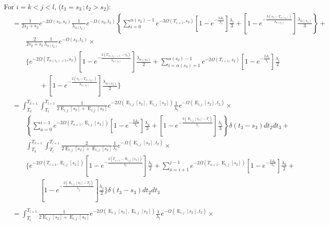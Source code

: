 \documentclass{article}
\DeclareMathOperator{\E}{E}
\begin{document}
For $i=k< j<l$, ($t_3=s_3\,;t_2>s_2$):
\begin{align*}
    &=\frac{1}{2s_2+s_3}e^{-2\Omega(s_3,s_2)}\frac{1}{\lambda_{\alpha(t_2)}}e^{-\Omega(s_2,t_2)}
    \left\{\sum_{i=0}^{\alpha(s_3)-1}e^{-3\Omega(T_{i+1},s_3)}
        \left[1-e^{-\frac{3\Delta_i}{\lambda_i}}\right]\frac{\lambda_i}{3}+
    \left[1-e^{-\frac{3\left(s_3-T_{\alpha(s_3)}\right)}{\lambda_{\alpha(s_3)}}}\right]
        \frac{\lambda_{\alpha(s_3)}}{3}\right\}+\\
    &\qquad\frac{2}{2s_2+s_3}\frac{1}{\lambda_{\alpha(t_2)}}e^{-\Omega(s_2,t_2)}\times\\
    &\qquad\Bigg\{e^{-2\Omega(T_{\alpha(s_3)+1},s_2)}\left[1-e^{-\frac{2\left(T_{\alpha(s_3)+1}-s_3\right)}{\lambda_{\alpha(s_3)}}}\right]\frac{\lambda_{\alpha(s_3)}}{2}+\sum_{i=\alpha(s_3)+1}^{\alpha(s_2)-1}e^{-2\Omega\left(T_{i+1},s_2\right)}\left[1-e^{-\frac{2\Delta_i}{\lambda_i}}\right]\frac{\lambda_i}{2}\\
    &\qquad\qquad+\left[1-e^{-\frac{2\left(s_2-T_{\alpha(s_2)}\right)}{\lambda_{\alpha(s_2)}}}\right]\frac{\lambda_{\alpha(s_2)}}{2}
    \Bigg\}
    \\
    &=\int_{T_k}^{T_{k+1}}\int_{T_l}^{T_{l+1}}\frac{1}{2\E_{i,j}[s_2]+\E_{i,j}[s_3]}e^{-2\Omega(\E_{i,j}[s_3],\E_{i,j}[s_2])}\frac{1}{\lambda_l}e^{-\Omega(\E_{i,j}[s_2],t_2)}\times\\
    &\qquad\left\{\sum_{a=0}^{i-1}e^{-3\Omega(T_{a+1},\E_{i,j}[s_3])}
        \left[1-e^{-\frac{3\Delta_a}{\lambda_a}}\right]\frac{\lambda_a}{3}+
    \left[1-e^{-\frac{3\left(\E_{i,j}[s_3]-T_i\right)}{\lambda_i}}\right]
    \frac{\lambda_i}{3}\right\}\delta(t_3-s_3)dt_2dt_3+\\
    &\qquad\int_{T_k}^{T_{k+1}}\int_{T_l}^{T_{l+1}}
        \frac{2}{2\E_{i,j}[s_2]+\E_{i,j}[s_3]}\frac{1}{\lambda_l}e^{-\Omega(\E_{i,j}[s_2],t_2)}\times\\
    &\qquad\Bigg\{e^{-2\Omega(T_{i+1},\E_{i,j}[s_2])}\left[1-e^{-\frac{2\left(T_{i+1}-\E_{i,j}[s_3]\right)}{\lambda_i}}\right]\frac{\lambda_i}{2}+\sum_{a=i+1}^{j-1}e^{-2\Omega\left(T_{a+1},\E_{i,j}[s_2]\right)}\left[1-e^{-\frac{2\Delta_a}{\lambda_a}}\right]\frac{\lambda_a}{2}+\\
    &\qquad\qquad\left[1-e^{-\frac{2\left(\E_{i,j}[s_2]-T_j\right)}{\lambda_j}}\right]\frac{\lambda_j}{2}
    \Bigg\}\delta(t_3-s_3)dt_2dt_3\\
    \\
    &=\int_{T_l}^{T_{l+1}}\frac{1}{2\E_{i,j}[s_2]+\E_{i,j}[s_3]}e^{-2\Omega(\E_{i,j}[s_3],\E_{i,j}[s_2])}\frac{1}{\lambda_l}e^{-\Omega(\E_{i,j}[s_2],t_2)}\times\\

\end{align*}
\end{document}
